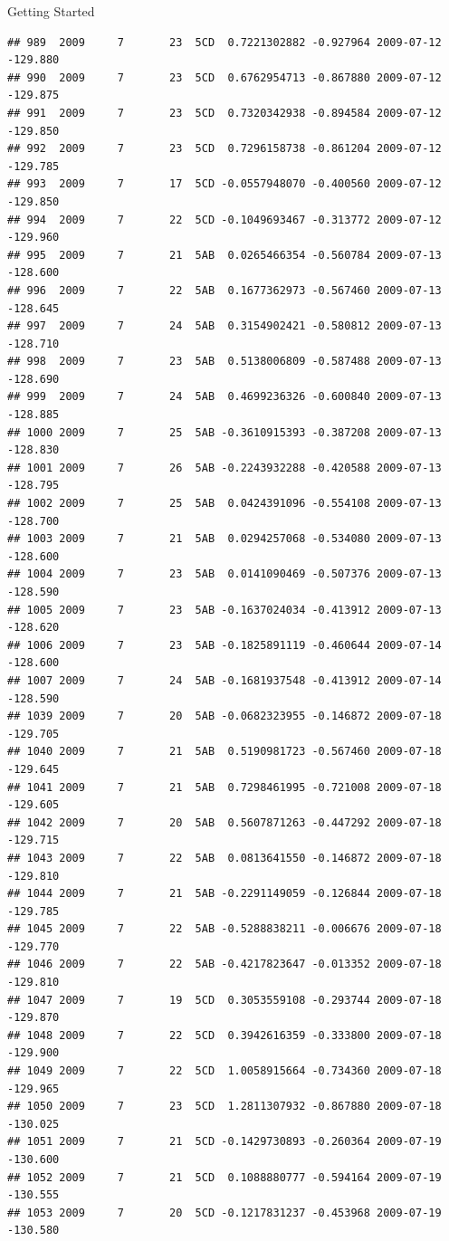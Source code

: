\documentclass[
  ignorenonframetext,
]{beamer}
\begin{document}
\begin{frame}[fragile]{Getting Started}
\begin{verbatim}
## 989  2009     7       23  5CD  0.7221302882 -0.927964 2009-07-12 -129.880
## 990  2009     7       23  5CD  0.6762954713 -0.867880 2009-07-12 -129.875
## 991  2009     7       23  5CD  0.7320342938 -0.894584 2009-07-12 -129.850
## 992  2009     7       23  5CD  0.7296158738 -0.861204 2009-07-12 -129.785
## 993  2009     7       17  5CD -0.0557948070 -0.400560 2009-07-12 -129.850
## 994  2009     7       22  5CD -0.1049693467 -0.313772 2009-07-12 -129.960
## 995  2009     7       21  5AB  0.0265466354 -0.560784 2009-07-13 -128.600
## 996  2009     7       22  5AB  0.1677362973 -0.567460 2009-07-13 -128.645
## 997  2009     7       24  5AB  0.3154902421 -0.580812 2009-07-13 -128.710
## 998  2009     7       23  5AB  0.5138006809 -0.587488 2009-07-13 -128.690
## 999  2009     7       24  5AB  0.4699236326 -0.600840 2009-07-13 -128.885
## 1000 2009     7       25  5AB -0.3610915393 -0.387208 2009-07-13 -128.830
## 1001 2009     7       26  5AB -0.2243932288 -0.420588 2009-07-13 -128.795
## 1002 2009     7       25  5AB  0.0424391096 -0.554108 2009-07-13 -128.700
## 1003 2009     7       21  5AB  0.0294257068 -0.534080 2009-07-13 -128.600
## 1004 2009     7       23  5AB  0.0141090469 -0.507376 2009-07-13 -128.590
## 1005 2009     7       23  5AB -0.1637024034 -0.413912 2009-07-13 -128.620
## 1006 2009     7       23  5AB -0.1825891119 -0.460644 2009-07-14 -128.600
## 1007 2009     7       24  5AB -0.1681937548 -0.413912 2009-07-14 -128.590
## 1039 2009     7       20  5AB -0.0682323955 -0.146872 2009-07-18 -129.705
## 1040 2009     7       21  5AB  0.5190981723 -0.567460 2009-07-18 -129.645
## 1041 2009     7       21  5AB  0.7298461995 -0.721008 2009-07-18 -129.605
## 1042 2009     7       20  5AB  0.5607871263 -0.447292 2009-07-18 -129.715
## 1043 2009     7       22  5AB  0.0813641550 -0.146872 2009-07-18 -129.810
## 1044 2009     7       21  5AB -0.2291149059 -0.126844 2009-07-18 -129.785
## 1045 2009     7       22  5AB -0.5288838211 -0.006676 2009-07-18 -129.770
## 1046 2009     7       22  5AB -0.4217823647 -0.013352 2009-07-18 -129.810
## 1047 2009     7       19  5CD  0.3053559108 -0.293744 2009-07-18 -129.870
## 1048 2009     7       22  5CD  0.3942616359 -0.333800 2009-07-18 -129.900
## 1049 2009     7       22  5CD  1.0058915664 -0.734360 2009-07-18 -129.965
## 1050 2009     7       23  5CD  1.2811307932 -0.867880 2009-07-18 -130.025
## 1051 2009     7       21  5CD -0.1429730893 -0.260364 2009-07-19 -130.600
## 1052 2009     7       21  5CD  0.1088880777 -0.594164 2009-07-19 -130.555
## 1053 2009     7       20  5CD -0.1217831237 -0.453968 2009-07-19 -130.580

\end{verbatim}
\end{frame}
\end{document}
